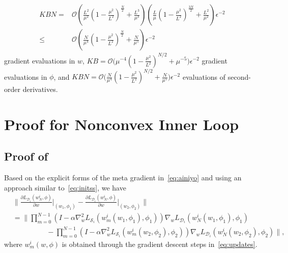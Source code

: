 \documentclass{osudissert96}
\begin{document}
\begin{align*}
KBN=&\mathcal{O}\left(\frac{L^2}{\mu^2}\left(1-\frac{\mu^2}{L^2}\right)^{\frac{N}{2}}+\frac{L^3}{\mu^3}\right)\left(\frac{L}{\mu}\left(1-\frac{\mu^2}{L^2}\right)^{\frac{3N}{2}}+\frac{L^2}{\mu^2}\right)\epsilon^{-2}
\\\leq&\mathcal{O}\left(\frac{N}{\mu^4}\left(1-\frac{\mu^2}{L^2}\right)^{\frac{N}{2}}+\frac{N}{\mu^5}\right)\epsilon^{-2}
\end{align*}
 gradient evaluations in $w$,  $KB=\mathcal{O}\Big(\mu^{-4}\left(1-\frac{\mu^2}{L^2}\right)^{N/2}+\mu^{-5}\Big)\epsilon^{-2}$ gradient evaluations in $\phi$,  and $KBN=\mathcal{O}\Big(\frac{N}{\mu^{4}}\left(1-\frac{\mu^2}{L^2}\right)^{N/2}+\frac{N}{\mu^{5}}\Big)\epsilon^{-2}$ evaluations of second-order derivatives. 



\section{Proof for Nonconvex Inner Loop}\label{appen:smooth_nonconvex}
\subsection*{Proof of~}
Based on the explicit forms of the meta gradient in~\cref{eq:ainiyo} and using an approach similar to~\cref{eq:initss}, we have 
\begin{align}\label{eq:def}
 &\Big\| \frac{\partial L_{\mathcal{D}_i}( w^i_N,\phi)}{\partial w} \Big |_{(w_1,\phi_1)} -  \frac{\partial L_{\mathcal{D}_i}( w^i_N,\phi)}{\partial w} \Big |_{(w_2,\phi_2)} \Big\| \nonumber
\\ &= \Big\|\prod_{m=0}^{N-1}(I - \alpha \nabla_w^2L_{\mathcal{S}_i}(w_{m}^i(w_1,\phi_1),\phi_1)) \nabla_{w} L_{\mathcal{D}_i} (w_{N}^i(w_1,\phi_1),\phi_1)\nonumber
\\&\hspace{2cm}-\prod_{m=0}^{N-1}(I - \alpha \nabla_w^2L_{\mathcal{S}_i}(w_{m}^i(w_2,\phi_2),\phi_2)) \nabla_{w} L_{\mathcal{D}_i} (w_{N}^i(w_2,\phi_2),\phi_2)\Big\|, 
\end{align}
where $w_m^i(w,\phi)$ is obtained through the gradient descent steps in~\cref{eq:updates}.
\end{document}
